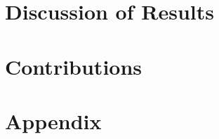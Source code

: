 \documentclass[11pt,letterpaper]{article}
\let\Oldsection\section
\renewcommand{\section}{\FloatBarrier\Oldsection}
\begin{document}
\section{Discussion of Results}
\label{sec:discussion-of-results}

\clearpage

\section{Contributions}
\label{sec:contributions}

\clearpage

\section{Appendix}
\label{sec:appendix}

\clearpage

%
\end{document}
